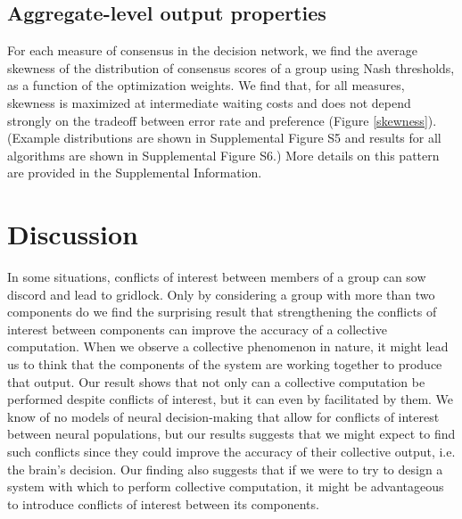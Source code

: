 \documentclass{pnastwo}
\begin{document}
\begin{article}
\subsection{Aggregate-level output properties}
For each measure of consensus in the decision network, we find the average skewness of the distribution of consensus scores of a group using Nash thresholds, as a function of the optimization weights. We find that, for all measures, skewness is maximized at intermediate waiting costs and does not depend strongly on the tradeoff between error rate and preference (Figure \ref{skewness}). (Example distributions are shown in Supplemental Figure S5 and results for all algorithms are shown in Supplemental Figure S6.)  More details on this pattern are provided in the Supplemental Information. 

\section{Discussion}

In some situations, conflicts of interest between members of a group can sow discord and lead to gridlock.  Only by considering a group with more than two components do we find the surprising result that strengthening the conflicts of interest between components can improve the accuracy of a collective computation. When we observe a collective phenomenon in nature, it might lead us to think that the components of the system are working together to produce that output. Our result shows that not only can a collective computation be performed despite conflicts of interest, but it can even by facilitated by them.  We know of no models of neural decision-making that allow for conflicts of interest between neural populations, but our results suggests that we might expect to find such conflicts since they could improve the accuracy of their collective output, i.e. the brain's decision. Our finding also suggests that if we were to try to design a system with which to perform collective computation, it might be advantageous to introduce conflicts of interest between its components.


\end{article}
\end{document}
